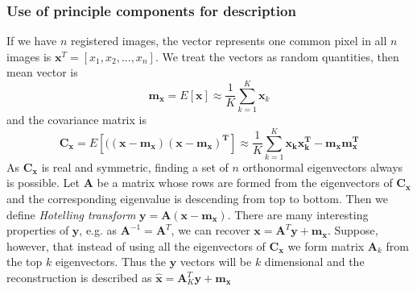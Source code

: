 \subsubsection{Use of principle components for description}
If we have $n$ registered images, the vector represents one common pixel in all $n$ images is $\mathbf{x}^T=[x_1, x_2,..., x_n]$. We treat the vectors as random quantities, then mean vector is \begin{equation}\mathbf{m_x}=E[\mathbf{x}]\approx \frac{1}{K}\sum_{k=1}^K\mathbf{x}_k\end{equation} and the covariance matrix is \begin{equation} \mathbf{C_x}=E\left[(\mathbf{(x-m_x)(x-m_x)^T} \right] \approx \frac{1}{K}\sum_{k=1}^K\mathbf{x_kx_k^T-m_xm_x^T}\end{equation}As $\mathbf{C_x}$ is real and symmetric, finding a set of $n$ orthonormal eigenvectors always is possible. Let $\mathbf{A}$ be a matrix whose rows are formed from the eigenvectors of $\mathbf{C_x}$ and the corresponding eigenvalue is descending from top to bottom. Then we define \emph{Hotelling transform} $\mathbf{y=A(x-m_x)}$. There are many interesting properties of $\mathbf{y}$, e.g. as $\mathbf{A}^{-1}=\mathbf{A}^T$, we can recover $\mathbf{x}=\mathbf{A}^T\mathbf{y}+\mathbf{m_x}$. Suppose, however, that instead of using all the eigenvectors of $\mathbf{C_x}$  we form matrix $\mathbf{A}_k$ from the top $k$ eigenvectors. Thus the $\mathbf{y}$ vectors will be $k$ dimensional and the reconstruction is described as $\hat{\mathbf{x}}=\mathbf{A}_K^T\mathbf{y}+\mathbf{m_x}$
